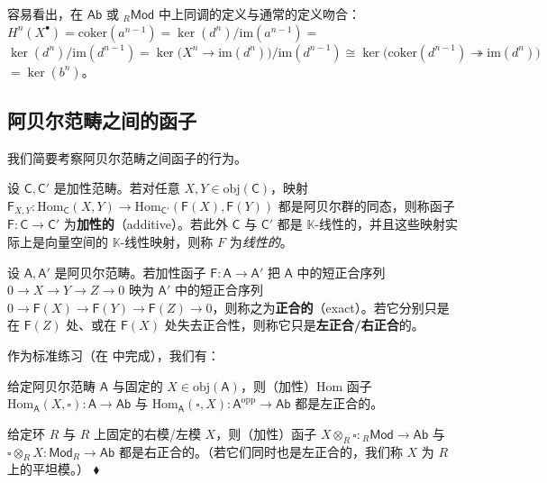 容易看出，在 $\mathsf{Ab}$ 或 ${}_R\mathsf{Mod}$ 中上同调的定义与通常的定义吻合：$H^n(X^\bullet)=\text{coker}(a^{n-1})=\ker(d^n)/\text{im}(a^{n-1})=$ $\ker(d^n)/\text{im}(d^{n-1})=\ker\big(X^n\!\rightarrow\!\text{im}(d^n)\big)/\text{im}(d^{n-1})\cong\ker\big(\text{coker}(d^{n-1})\!\twoheadrightarrow\!\text{im}(d^n)\big)$ $=\ker(b^n)$。


\subsection{阿贝尔范畴之间的函子}\label{ch1.3}


我们简要考察阿贝尔范畴之间函子的行为。

\begin{Def}\label{additiveexactfunc}
	设 $\mathsf{C},\mathsf{C}'$ 是加性范畴。若对任意 $X,Y\in\text{obj}(\mathsf{C})$，映射 $\mathsf{F}_{X,Y}:\text{Hom}_\mathsf{C}(X,Y)\rightarrow\text{Hom}_{\mathsf{C}'}(\mathsf{F}(X),\mathsf{F}(Y))$ 都是阿贝尔群的同态，则称函子 $\mathsf{F}:\mathsf{C}\rightarrow\mathsf{C}'$ 为\textbf{加性的}（additive）。若此外 $\mathsf{C}$ 与 $\mathsf{C}'$ 都是 $\mathbb{K}$-线性的，并且这些映射实际上是向量空间的 $\mathbb{K}$-线性映射，则称 $F$ 为\textit{线性的}。

	设 $\mathsf{A},\mathsf{A}'$ 是阿贝尔范畴。若加性函子 $\mathsf{F}:\mathsf{A}\rightarrow\mathsf{A}'$ 把 $\mathsf{A}$ 中的短正合序列 $0\rightarrow X\rightarrow Y\rightarrow Z\rightarrow 0$ 映为 $\mathsf{A}'$ 中的短正合序列 $0\rightarrow \mathsf{F}(X)\rightarrow \mathsf{F}(Y)\rightarrow \mathsf{F}(Z)\rightarrow 0$，则称之为\textbf{正合的}（exact）。若它分别只是在 $\mathsf{F}(Z)$ 处、或在 $\mathsf{F}(X)$ 处失去正合性，则称它只是\textbf{左正合/右正合}的。
\end{Def}


作为标准练习（在 \cite[Propositions II.6.5, II.6.6]{[GM03]} 中完成），我们有：

\begin{Ex}\label{exactfuncexample}
	给定阿贝尔范畴 $\mathsf{A}$ 与固定的 $X\in\text{obj}(\mathsf{A})$，则（加性）Hom 函子 $\text{Hom}_\mathsf{A}(X,\square):\mathsf{A}\rightarrow\mathsf{Ab}$ 与 $\text{Hom}_\mathsf{A}(\square,X):\mathsf{A}^\text{opp}\rightarrow\mathsf{Ab}$ 都是左正合的。

	给定环 $R$ 与 $R$ 上固定的右模/左模 $X$，则（加性）函子 $X\otimes_R \square:{}_R\mathsf{Mod}\rightarrow\mathsf{Ab}$ 与 $\square\otimes_R X:\mathsf{Mod}_R\rightarrow\mathsf{Ab}$ 都是右正合的。（若它们同时也是左正合的，我们称 $X$ 为 $R$ 上的平坦模。）	\hfill $\blacklozenge$
\end{Ex}

